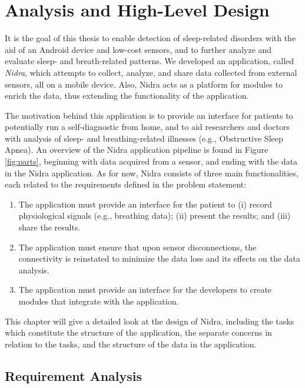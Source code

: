 
\chapter{Analysis and High-Level Design}

It is the goal of this thesis to enable detection of sleep-related disorders with the aid of an Android device and low-cost sensors, and to further analyze and evaluate sleep- and breath-related patterns. We developed an application, called \textit{Nidra}, which attempts to collect, analyze, and share data collected from external sensors, all on a mobile device. Also, Nidra acts as a platform for modules to enrich the data, thus extending the functionality of the application.

The motivation behind this application is to provide an interface for patients to potentially run a self-diagnostic from home, and to aid researchers and doctors with analysis of sleep- and breathing-related illnesses (e.g., Obstructive Sleep Apnea). An overview of the Nidra application pipeline is found in Figure \ref{fig:parts}, beginning with data acquired from a sensor, and ending with the data in the Nidra application. As for now, Nidra consists of three main functionalities, each related to the requirements defined in the problem statement: 

\begin{enumerate}
    \item The application must provide an interface for the patient to (i) record physiological signals (e.g., breathing data); (ii) present the results; and (iii) share the results.
    \item The application must ensure that upon sensor disconnections, the connectivity is reinstated to minimize the data loss and its effects on the data analysis.
    \item The application must provide an interface for the developers to create modules that integrate with the application.
\end{enumerate}

This chapter will give a detailed look at the design of Nidra, including the tasks which constitute the structure of the application, the separate concerns in relation to the tasks, and the structure of the data in the application.

\section{Requirement Analysis}

